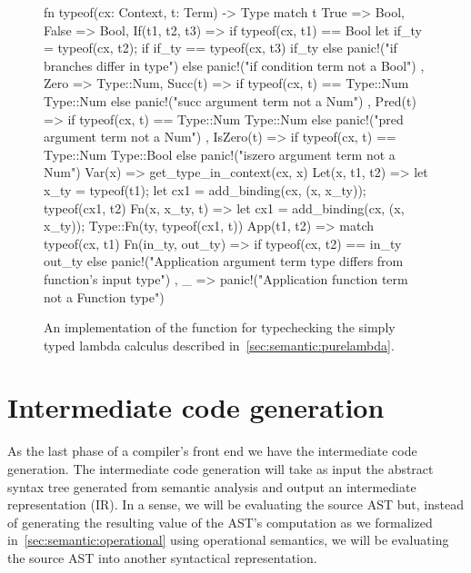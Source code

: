 \documentclass[
  oneside,
  english,
  coorientadorbanca,
  noabntexcite
]{ufsc-thesis-rn46-2019}
\newcommand{\code}[1]{\text{\scpfamily\setlength\spaceskip{0.35em}#1}}
\begin{document}
\begin{figure}[h!]
  \centering
  \begin{minipage}{0.8\textwidth}
    \begin{rustcode}
fn typeof(cx: Context, t: Term) -> Type {
  match t {
    True => Bool,
    False => Bool,
    If(t1, t2, t3) => if typeof(cx, t1) == Bool {
      let if_ty = typeof(cx, t2);
      if if_ty == typeof(cx, t3) {
        if_ty
      } else {
        panic!("if branches differ in type")
      }
    } else {
      panic!("if condition term not a Bool")
    },
    Zero => Type::Num,
    Succ(t) => if typeof(cx, t) == Type::Num {
      Type::Num
    } else {
      panic!("succ argument term not a Num")
    },
    Pred(t) => if typeof(cx, t) == Type::Num {
      Type::Num
    } else {
      panic!("pred argument term not a Num")
    },
    IsZero(t) => if typeof(cx, t) == Type::Num {
      Type::Bool
    } else {
      panic!("iszero argument term not a Num")
    }
    Var(x) => get_type_in_context(cx, x)
    Let(x, t1, t2) => {
      let x_ty = typeof(t1);
      let cx1 = add_binding(cx, (x, x_ty));
      typeof(cx1, t2)
    }
    Fn(x, x_ty, t) => {
      let cx1 = add_binding(cx, (x, x_ty));
      Type::Fn(ty, typeof(cx1, t))
    }
    App(t1, t2) => match typeof(cx, t1) {
      Fn(in_ty, out_ty) => if typeof(cx, t2) == in_ty {
        out_ty
      } else {
        panic!("Application argument term type differs from function's input type")
      },
      _ => panic!("Application function term not a Function type")
    }
  }
}
      \end{rustcode}
  \end{minipage}
  \caption{
    An implementation of the \code{typeof} function for typechecking the simply typed lambda calculus described in~\cref{sec:semantic:purelambda}.
  }\label{fig:typeof_impl}
\end{figure}

\section{Intermediate code generation}\label{chapter:background:sec:intermediate}

As the last phase of a compiler's front end we have the intermediate code generation.
The intermediate code generation will take as input the abstract syntax tree generated from semantic analysis and output an intermediate representation (IR).
In a sense, we will be evaluating the source AST but, instead of generating the resulting value of the AST's computation as we formalized in~\cref{sec:semantic:operational} using operational semantics, we will be evaluating the source AST into another syntactical representation.
\end{document}

